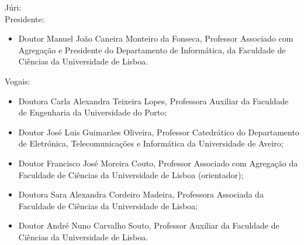\begin{singlespace}
\flushleft\fontsize{12.2}{14.4}\selectfont Júri: \\
\fontsize{12.2}{14.4}\selectfont Presidente: \\
\begin{itemize}
    \item Doutor Manuel João Caneira Monteiro da Fonseca, Professor Associado com Agregação e Presidente do Departamento de Informática, da Faculdade de Ciências da Universidade de Lisboa.
\end{itemize}
\fontsize{12.2}{14.4}\selectfont  Vogais: \\
\begin{itemize}
    \item Doutora Carla Alexandra Teixeira Lopes, Professora Auxiliar da Faculdade de Engenharia da
Universidade do Porto;
    \item Doutor José Luis Guimarães Oliveira, Professor Catedrático do Departamento de Eletrónica,
Telecomunicações e Informática da Universidade de Aveiro;
    \item Doutor Francisco José Moreira Couto, Professor Associado com Agregação da Faculdade de Ciências da Universidade de Lisboa (orientador);
    \item Doutora Sara Alexandra Cordeiro Madeira, Professora Associada da Faculdade de Ciências da
Universidade de Lisboa;
    \item Doutor André Nuno Carvalho Souto, Professor Auxiliar da Faculdade de Ciências da Universidade de Lisboa.
\end{itemize}

\end{singlespace}


